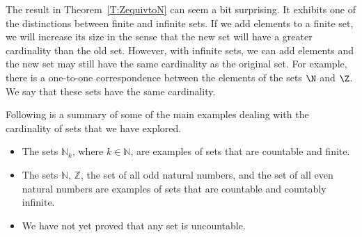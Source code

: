 The result in Theorem~\ref{T:ZequivtoN} can seem a bit surprising.  It exhibits one of the distinctions between finite and infinite sets.  If we add elements to a finite set, we will increase its size in the sense that the new set will have a greater cardinality than the old set.  However, with infinite sets, we can add elements and the new set may still have the same cardinality as the original set.  For example, there is a one-to-one correspondence between the elements of the sets $\N$ and $\Z$.  We say that these sets have the same cardinality.

Following is a summary of some of the main examples dealing with the cardinality of sets that we have explored.

\begin{itemize}
\item The sets $\mathbb{N}_k$, where $k \in \mathbb{N}$, are examples of sets that are countable and finite.
\item The sets $\mathbb{N}$, $\mathbb{Z}$, the set of all odd natural numbers, and the set of all even natural numbers are examples of sets that are countable and countably infinite.
\item We have not yet proved that any set is uncountable.
\end{itemize}

%

\endinput
